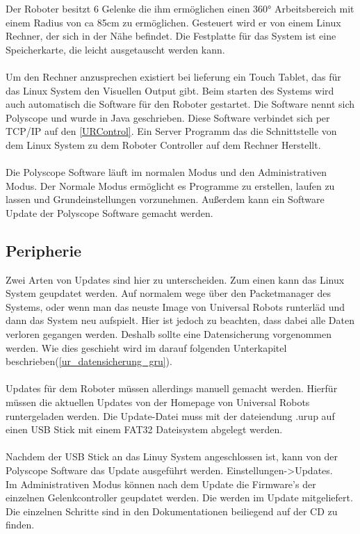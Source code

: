 Der Roboter besitzt 6 Gelenke die ihm ermöglichen einen 360° Arbeitsbereich mit einem Radius von ca 85cm zu ermöglichen. Gesteuert wird er von einem Linux Rechner, der sich in der Nähe befindet. 
Die Festplatte für das System ist eine Speicherkarte, die leicht ausgetauscht werden kann.
\\\\
Um den Rechner anzusprechen existiert bei lieferung ein Touch Tablet, das für das Linux System den Visuellen Output gibt. Beim starten des Systems wird auch automatisch die Software für den Roboter gestartet. Die Software nennt sich Polyscope und wurde in Java geschrieben. Diese Software verbindet sich per TCP/IP auf den \ref{URControl}. Ein Server Programm das die Schnittstelle von dem Linux System zu dem Roboter Controller auf dem Rechner Herstellt.
\\\\
Die Polyscope Software läuft im normalen Modus und den Administrativen Modus. Der Normale Modus ermöglicht es Programme zu erstellen, laufen zu lassen und Grundeinstellungen vorzunehmen. Außerdem kann ein Software Update der Polyscope Software gemacht werden.

\subsection{Peripherie}
\label{ur_update_gru}

Zwei Arten von Updates sind hier zu unterscheiden. Zum einen kann das Linux System geupdatet werden. Auf normalem wege über den Packetmanager des Systems, oder wenn man das neuste Image von Universal Robots runterläd und dann das System neu aufspielt. Hier ist jedoch zu beachten, dass dabei alle Daten verloren gegangen werden. Deshalb sollte eine Datensicherung vorgenommen werden. Wie dies geschieht wird im darauf folgenden Unterkapitel beschrieben(\ref{ur_datensicherung_gru}).
\\\\
Updates für dem Roboter müssen allerdings manuell gemacht werden. Hierfür müssen die aktuellen Updates von der Homepage von Universal Robots runtergeladen werden. Die Update-Datei muss mit der dateiendung .urup auf einen USB Stick mit einem FAT32 Dateisystem abgelegt werden.\\\\
Nachdem der USB Stick an das Linuy System angeschlossen ist, kann von der Polyscope Software das Update ausgeführt werden. Einstellungen->Updates.\\
Im Administrativen Modus können nach dem Update die Firmware's der einzelnen Gelenkcontroller geupdatet werden. Die werden im Update mitgeliefert. Die einzelnen Schritte sind in den Dokumentationen beiliegend auf der CD zu finden.

